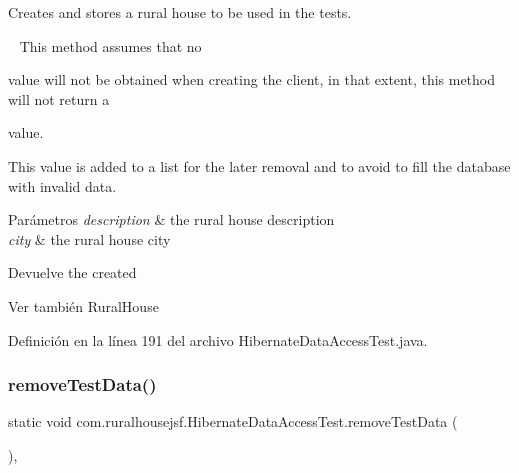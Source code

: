 Creates and stores a rural house to be used in the tests. 

~\newline
 This method assumes that no
\begin{DoxyCode}{0}
\DoxyCodeLine{\textcolor{keyword}{null} }
\end{DoxyCode}
 value will not be obtained when creating the client, in that extent, this method will not return a 
\begin{DoxyCode}{0}
\DoxyCodeLine{\textcolor{keyword}{null} }
\end{DoxyCode}
 value. 

This value is added to a list for the later removal and to avoid to fill the database with invalid data.


\begin{DoxyParams}{Parámetros}
{\em description} & the rural house description \\
\hline
{\em city} & the rural house city\\
\hline
\end{DoxyParams}
\begin{DoxyReturn}{Devuelve}
the created
\begin{DoxyCode}{0}
\end{DoxyCode}

\end{DoxyReturn}
\begin{DoxySeeAlso}{Ver también}
Rural\+House 
\end{DoxySeeAlso}


Definición en la línea 191 del archivo Hibernate\+Data\+Access\+Test.\+java.

\mbox{\label{a00272_a71fef61bb66234d92d84ddd795de842a}} 
\subsubsection{\texorpdfstring{removeTestData()}{removeTestData()}}
{\footnotesize\ttfamily static void com.\+ruralhousejsf.\+Hibernate\+Data\+Access\+Test.\+remove\+Test\+Data (\begin{DoxyParamCaption}{ }\end{DoxyParamCaption})\hspace{0.3cm}{\ttfamily [static]}, {\ttfamily [private]}}



